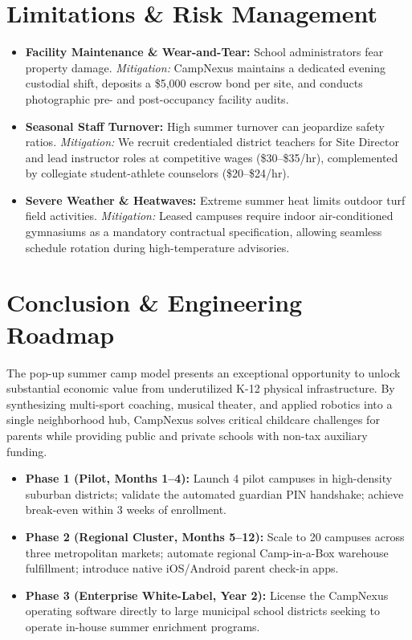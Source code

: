 \documentclass[11pt,a4paper]{article}
\begin{document}
\section{Limitations \& Risk Management}

\begin{itemize}
    \item \textbf{Facility Maintenance \& Wear-and-Tear:} School administrators fear property damage. \textit{Mitigation:} CampNexus maintains a dedicated evening custodial shift, deposits a \$5,000 escrow bond per site, and conducts photographic pre- and post-occupancy facility audits.
    \item \textbf{Seasonal Staff Turnover:} High summer turnover can jeopardize safety ratios. \textit{Mitigation:} We recruit credentialed district teachers for Site Director and lead instructor roles at competitive wages (\$30--\$35/hr), complemented by collegiate student-athlete counselors (\$20--\$24/hr).
    \item \textbf{Severe Weather \& Heatwaves:} Extreme summer heat limits outdoor turf field activities. \textit{Mitigation:} Leased campuses require indoor air-conditioned gymnasiums as a mandatory contractual specification, allowing seamless schedule rotation during high-temperature advisories.
\end{itemize}

\section{Conclusion \& Engineering Roadmap}

The pop-up summer camp model presents an exceptional opportunity to unlock substantial economic value from underutilized K-12 physical infrastructure. By synthesizing multi-sport coaching, musical theater, and applied robotics into a single neighborhood hub, CampNexus solves critical childcare challenges for parents while providing public and private schools with non-tax auxiliary funding.

\begin{itemize}
    \item \textbf{Phase 1 (Pilot, Months 1--4):} Launch 4 pilot campuses in high-density suburban districts; validate the automated guardian PIN handshake; achieve break-even within 3 weeks of enrollment.
    \item \textbf{Phase 2 (Regional Cluster, Months 5--12):} Scale to 20 campuses across three metropolitan markets; automate regional Camp-in-a-Box warehouse fulfillment; introduce native iOS/Android parent check-in apps.
    \item \textbf{Phase 3 (Enterprise White-Label, Year 2):} License the CampNexus operating software directly to large municipal school districts seeking to operate in-house summer enrichment programs.
\end{itemize}
\end{document}
